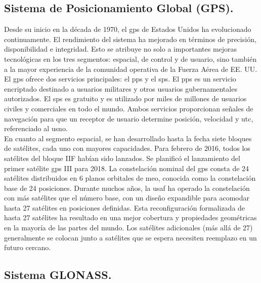 \subsection*{\fontsize{12}{18}\selectfont Sistema de Posicionamiento Global (GPS).}

\begin{justify}
    Desde su inicio en la década de 1970, el \gls{gps} de Estados Unidos ha evolucionado continuamente. El rendimiento del sistema ha mejorado
    en términos de precisión, disponibilidad e integridad. Esto se atribuye no solo a importantes mejoras tecnológicas en los tres segmentos: espacial, de control y de usuario,
    sino también a la mayor experiencia de la comunidad operativa de la Fuerza Aérea de EE. UU. El \gls{gps} ofrece dos servicios principales: el \gls{pps}
    y el \gls{sps}. El \gls{pps} es un servicio encriptado destinado a usuarios militares y otros usuarios gubernamentales autorizados. El \gls{sps} es gratuito
    y es utilizado por miles de millones de usuarios civiles y comerciales en todo el mundo. Ambos servicios proporcionan señales de navegación para que un receptor de usuario
    determine posición, velocidad y \gls{utc}, referenciado al \gls{usno}.\\
    
    En cuanto al segmento espacial, se han desarrollado hasta la fecha siete bloques de satélites, cada uno con mayores capacidades. Para febrero de 2016, todos los satélites del
    bloque IIF habían sido lanzados. Se planificó el lanzamiento del primer satélite \gls{gps} III para 2018. La constelación nominal del \gls{gps} consta de 24 satélites distribuidos en 6
    planos orbitales de \gls{meo}, conocida como la constelación base de 24 posiciones. Durante muchos años, la \gls{usaf} ha operado la
    constelación con más satélites que el número base, con un diseño expandible para acomodar hasta 27 satélites en posiciones definidas. Esta reconfiguración formalizada de
    hasta 27 satélites ha resultado en una mejor cobertura y propiedades geométricas en la mayoría de las partes del mundo. Los satélites adicionales (más allá de 27)
    generalmente se colocan junto a satélites que se espera necesiten reemplazo en un futuro cercano.
\end{justify}

\subsection*{\fontsize{12}{18}\selectfont Sistema GLONASS.}


